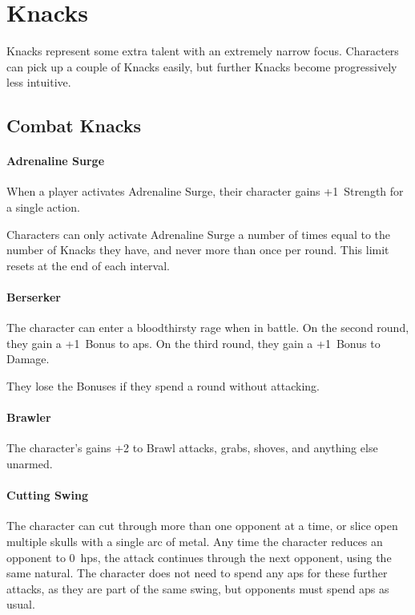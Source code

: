\chapter[Hall of Knacks]{Knacks}
\label{knacks}

Knacks represent some extra talent with an extremely narrow focus.
Characters can pick up a couple of Knacks easily, but further Knacks become progressively less intuitive.

\section{Combat Knacks}

\begin{multicols}{2}

\subsubsection{Adrenaline Surge}
\label{adrenalinesurge}

When a player activates Adrenaline Surge, their character gains +1~Strength for a single action.

Characters can only activate Adrenaline Surge a number of times equal to the number of Knacks they have, and never more than once per round.
This limit resets at the end of each \gls{interval}.

\subsubsection{Berserker}

The character can enter a bloodthirsty rage when in battle.
On the second round, they gain a +1~Bonus to \glspl{ap}.
On the third round, they gain a +1~Bonus to Damage.

They lose the Bonuses if they spend a round without attacking.

\subsubsection{Brawler}

The character's gains +2 to Brawl attacks, grabs, shoves, and anything else unarmed.

\subsubsection{Cutting Swing}

The character can cut through more than one opponent at a time, or slice open multiple skulls with a single arc of metal.
Any time the character reduces an opponent to 0~\glspl{hp}, the attack continues through the next opponent, using the same \gls{natural}.
The character does not need to spend any \glspl{ap} for these further attacks, as they are part of the same swing, but opponents must spend \glspl{ap} as usual.


\end{multicols}
